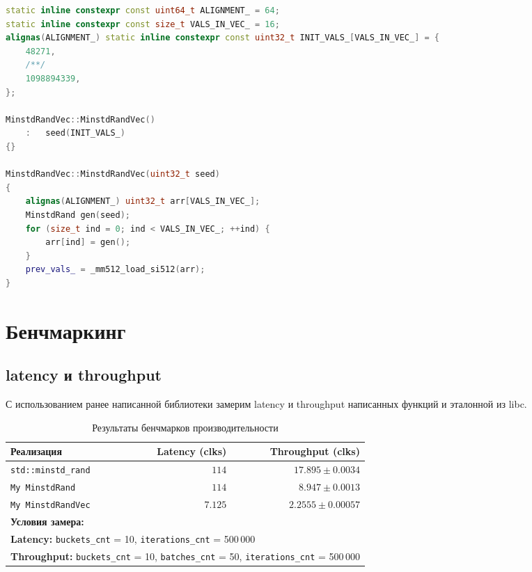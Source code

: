 \documentclass[12pt]{extarticle}
\begin{document}
\begin{lstlisting}[language=c++]
static inline constexpr const uint64_t ALIGNMENT_ = 64;
static inline constexpr const size_t VALS_IN_VEC_ = 16;
alignas(ALIGNMENT_) static inline constexpr const uint32_t INIT_VALS_[VALS_IN_VEC_] = {
    48271,
    /**/
    1098894339,
};

MinstdRandVec::MinstdRandVec() 
    :   seed(INIT_VALS_)
{}

MinstdRandVec::MinstdRandVec(uint32_t seed)
{
    alignas(ALIGNMENT_) uint32_t arr[VALS_IN_VEC_];
    MinstdRand gen(seed);
    for (size_t ind = 0; ind < VALS_IN_VEC_; ++ind) {
        arr[ind] = gen();
    }
    prev_vals_ = _mm512_load_si512(arr);
}
\end{lstlisting}

\section{Бенчмаркинг}

\subsection{latency и throughput}

С использованием ранее написанной библиотеки замерим latency и throughput написанных функций и эталонной из libc.

\begin{table}[h!]
\centering
\begin{tabular}{l r r}
\toprule
\textbf{Реализация} & \textbf{Latency (clks)} & \textbf{Throughput (clks)} \\
\midrule
\texttt{std::minstd\_rand} & $114$ & $17.895 \pm 0.0034$ \\
\texttt{My MinstdRand}    & $114$ & $8.947 \pm 0.0013$ \\
\texttt{My MinstdRandVec} & $7.125$ & $2.2555 \pm 0.00057$ \\
\midrule
\multicolumn{3}{l}{\small \textbf{Условия замера:}} \\
\multicolumn{3}{l}{\textbf{Latency:} \texttt{buckets\_cnt} = 10, \texttt{iterations\_cnt} = 500\,000} \\
\multicolumn{3}{l}{\textbf{Throughput:} \texttt{buckets\_cnt} = 10, \texttt{batches\_cnt} = 50, \texttt{iterations\_cnt} = 500\,000} \\
\bottomrule
\end{tabular}
\caption{Результаты бенчмарков производительности}
\label{tab:benchmarks}
\end{table}
\end{document}
